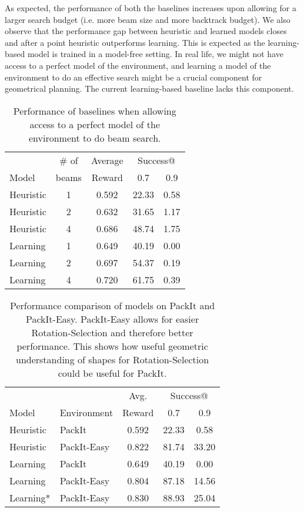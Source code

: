 \documentclass{article}
\begin{document}
As expected, the performance of both the baselines increases upon allowing for a larger search budget (i.e. more beam size and more backtrack budget). We also observe that the performance gap between heuristic and learned models closes and after a point heuristic outperforms learning. This is expected as the learning-based model is trained in a model-free setting. In real life, we might not have access to a perfect model of the environment, and learning a model of the environment to do an effective search might be a crucial component for geometrical planning. The current learning-based baseline lacks this component.
\begin{table}[t]
    \centering
    \begin{center}
    \begin{tabular}{l||c|c|cc}
    \hline
          & $\#$ of & Average & \multicolumn{2}{c}{Success@}  \\
    Model  & beams & Reward  & 0.7 & 0.9 \\
     \hline \hline
    Heuristic & 1 & 0.592 & 22.33 & 0.58 \\
    Heuristic & 2 & 0.632 & 31.65 & 1.17 \\
    Heuristic & 4 & 0.686 & 48.74 & 1.75 \\
    \hline
    Learning  & 1 & 0.649 & 40.19 & 0.00 \\
    Learning  & 2 & 0.697 & 54.37 & 0.19 \\
    Learning  & 4 & 0.720 & 61.75 & 0.39 \\
    \hline
    \end{tabular}
    \end{center}
    \caption{Performance of baselines when allowing access to a perfect model of the environment to do beam search{\footnotemark[3]}.}
    \label{tab:beam}
\end{table}
\begin{table}[t]
    \centering
    \begin{center}
    \begin{tabular}{ll||c|cc}
    \hline
     & &  Avg. & \multicolumn{2}{c}{Success@}  \\
     Model & Environment & Reward & 0.7 & 0.9 \\
     \hline \hline
     Heuristic&PackIt      & 0.592 & 22.33 & 0.58 \\
     Heuristic&PackIt-Easy & 0.822 & 81.74 & 33.20 \\
     \hline
     Learning&PackIt       & 0.649 & 40.19 & 0.00  \\
     Learning&PackIt-Easy  & 0.804 & 87.18 & 14.56 \\
     Learning*&PackIt-Easy & 0.830 & 88.93 & 25.04 \\
    \hline
    \end{tabular}
    \end{center}
    \caption{Performance comparison of models on PackIt and PackIt-Easy. PackIt-Easy allows for easier Rotation-Selection and therefore better performance. This shows how useful geometric understanding of shapes for Rotation-Selection could be useful for PackIt{\footnotemark[3]}{\footnotemark[4]}.}
    \label{tab:packit_easy}
\end{table}
\end{document}
